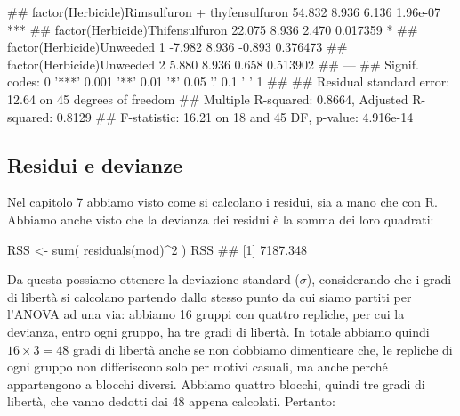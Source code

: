 \documentclass[a4paper,12pt,oneside]{book}
\newenvironment{Shaded}{}{}
\newcommand{\KeywordTok}[1]{#1}
\newcommand{\DecValTok}[1]{#1}
\newcommand{\StringTok}[1]{#1}
\newcommand{\CommentTok}[1]{#1}
\newcommand{\OperatorTok}[1]{#1}
\newcommand{\NormalTok}[1]{#1}
\begin{document}
\begin{Shaded}
\begin{Highlighting}[]
\CommentTok{## factor(Herbicide)Rimsulfuron + thyfensulfuron                 54.832      8.936   6.136 1.96e-07 ***}
\CommentTok{## factor(Herbicide)Thifensulfuron                               22.075      8.936   2.470 0.017359 *  }
\CommentTok{## factor(Herbicide)Unweeded 1                                   -7.982      8.936  -0.893 0.376473    }
\CommentTok{## factor(Herbicide)Unweeded 2                                    5.880      8.936   0.658 0.513902    }
\CommentTok{## ---}
\CommentTok{## Signif. codes:  0 '***' 0.001 '**' 0.01 '*' 0.05 '.' 0.1 ' ' 1}
\CommentTok{## }
\CommentTok{## Residual standard error: 12.64 on 45 degrees of freedom}
\CommentTok{## Multiple R-squared:  0.8664, Adjusted R-squared:  0.8129 }
\CommentTok{## F-statistic: 16.21 on 18 and 45 DF,  p-value: 4.916e-14}
\end{Highlighting}
\end{Shaded}

\normalsize

\hypertarget{residui-e-devianze}{%
\subsection{Residui e devianze}\label{residui-e-devianze}}

Nel capitolo 7 abbiamo visto come si calcolano i residui, sia a mano che con R. Abbiamo anche visto che la devianza dei residui è la somma dei loro quadrati:

\begin{Shaded}
\begin{Highlighting}[]
\NormalTok{RSS <-}\StringTok{ }\KeywordTok{sum}\NormalTok{( }\KeywordTok{residuals}\NormalTok{(mod)}\OperatorTok{^}\DecValTok{2}\NormalTok{ )}
\NormalTok{RSS}
\CommentTok{## [1] 7187.348}
\end{Highlighting}
\end{Shaded}

Da questa possiamo ottenere la deviazione standard (\(\sigma\)), considerando che i gradi di libertà si calcolano partendo dallo stesso punto da cui siamo partiti per l'ANOVA ad una via: abbiamo 16 gruppi con quattro repliche, per cui la devianza, entro ogni gruppo, ha tre gradi di libertà. In totale abbiamo quindi \(16 \times 3 = 48\) gradi di libertà anche se non dobbiamo dimenticare che, le repliche di ogni gruppo non differiscono solo per motivi casuali, ma anche perché appartengono a blocchi diversi. Abbiamo quattro blocchi, quindi tre gradi di libertà, che vanno dedotti dai 48 appena calcolati. Pertanto:
\end{document}
